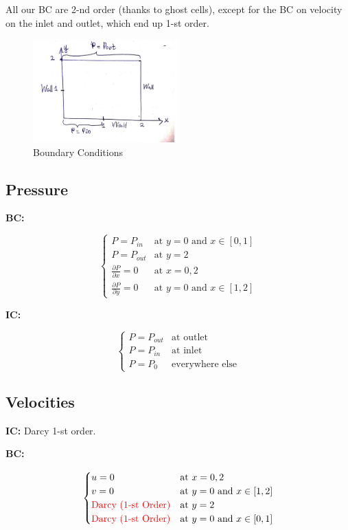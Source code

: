 \documentclass[a4paper,12pt]{article}
\begin{document}
{\color{red}All our BC are 2-nd order (thanks to ghost
    cells), except for the BC on velocity on the inlet
and outlet, which end up 1-st order.}

\begin{figure}[H]
    \centering
    \includegraphics[width=0.5\textwidth]{img/diagram.pdf}
    \caption{Boundary Conditions}
    \label{fig:img-diagram-pdf}
\end{figure}

\subsection{Pressure}

\textbf{BC:}

\[
\begin{cases}
    P = P_{in} &\text{at } y = 0
    \text{ and } x \in [0, 1] \\
    P = P_{out} &\text{at } y = 2 \\
    \frac{\partial P}{\partial x} = 0 &\text{at }
    x = 0, 2 \\
    \frac{\partial P}{\partial y} = 0 &\text{at }
    y = 0 \text{ and } x \in [1, 2]
\end{cases}
\] 

\textbf{IC:}

\[
\begin{cases}
    P = P_{out} &\text{at outlet} \\
    P = P_{in}  &\text{at inlet} \\
    P = P_0     &\text{everywhere else}
\end{cases}
\] 

\subsection{Velocities}

\textbf{IC:} Darcy 1-st order.

\textbf{BC:}

\[
\begin{cases}
    u = 0 &\text{at } x = 0, 2 \\
    v = 0 &\text{at } y = 0 \text{ and } x \in [1, 2] \\
    {\color{red}\text{Darcy (1-st Order)}}
          &\text{at } y = 2 \\
    {\color{red}\text{Darcy (1-st Order)}}
          &\text{at } y = 0
    \text{ and } x \in [0, 1]\\
\end{cases}
\] 
\end{document}
